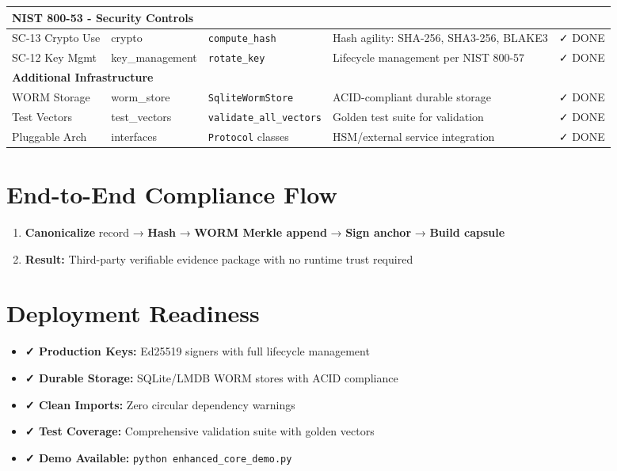 \documentclass[11pt,a4paper]{article}
\begin{document}
\begin{longtable}{|p{2.5cm}|p{2cm}|p{1.8cm}|p{6cm}|p{1.5cm}|}
\multicolumn{5}{|l|}{\cellcolor{blue!20}\textbf{NIST 800-53 - Security Controls}} \\
\hline

SC-13 Crypto Use & crypto & \texttt{compute\_hash} & Hash agility: SHA-256, SHA3-256, BLAKE3 & \cellcolor{green!30}✓ DONE \\
\hline

SC-12 Key Mgmt & key\_management & \texttt{rotate\_key} & Lifecycle management per NIST 800-57 & \cellcolor{green!30}✓ DONE \\
\hline

\multicolumn{5}{|l|}{\cellcolor{blue!20}\textbf{Additional Infrastructure}} \\
\hline

WORM Storage & worm\_store & \texttt{SqliteWormStore} & ACID-compliant durable storage & \cellcolor{green!30}✓ DONE \\
\hline

Test Vectors & test\_vectors & \texttt{validate\_all\_vectors} & Golden test suite for validation & \cellcolor{green!30}✓ DONE \\
\hline

Pluggable Arch & interfaces & \texttt{Protocol} classes & HSM/external service integration & \cellcolor{green!30}✓ DONE \\
\hline

\end{longtable}

\section*{End-to-End Compliance Flow}

\begin{enumerate}
    \item \textbf{Canonicalize} record → \textbf{Hash} → \textbf{WORM Merkle append} → \textbf{Sign anchor} → \textbf{Build capsule}
    \item \textbf{Result:} Third-party verifiable evidence package with no runtime trust required
\end{enumerate}

\section*{Deployment Readiness}

\begin{itemize}
    \item \textbf{✓ Production Keys:} Ed25519 signers with full lifecycle management
    \item \textbf{✓ Durable Storage:} SQLite/LMDB WORM stores with ACID compliance  
    \item \textbf{✓ Clean Imports:} Zero circular dependency warnings
    \item \textbf{✓ Test Coverage:} Comprehensive validation suite with golden vectors
    \item \textbf{✓ Demo Available:} \texttt{python enhanced\_core\_demo.py}
\end{itemize}
\end{document}
